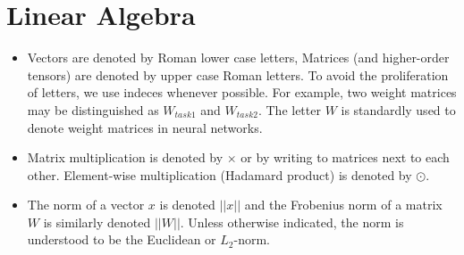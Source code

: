 \documentclass[14pt,a4paper]{article}
\newcommand{\norm}[1]{\lvert \lvert #1 \rvert \rvert}
\begin{document}
\section{Linear Algebra}
\begin{itemize}
\item Vectors are denoted by Roman lower case letters, Matrices (and higher-order tensors) are denoted by
upper case Roman letters. To avoid the proliferation of letters, we use indeces whenever possible. For example,
two weight matrices may be distinguished as $ W_{task1} $ and $ W_{task2} $. The letter $ W $ is standardly
used to denote weight matrices in neural networks.
\item Matrix multiplication is denoted by $ \times $ or by writing
to matrices next to each other. Element-wise multiplication (Hadamard product) is denoted by $ \odot $.
\item The norm of a vector $ x $ is denoted $ \norm{x} $ and the Frobenius norm of a matrix $ W $ is similarly denoted $ \norm{W} $. Unless otherwise indicated, the norm is understood to be the Euclidean or $ L_{2} $-norm.
\end{itemize}
\end{document}
